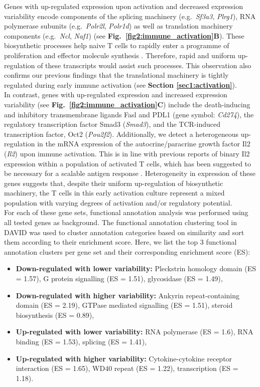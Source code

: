 Genes with up-regulated expression upon activation and decreased expression variability encode components of the splicing machinery (e.g.~\textit{Sf3a3}, \textit{Plrg1}), RNA polymerase subunits (e.g.~\textit{Polr2l}, \textit{Polr1d}) as well as translation machinery components (e.g.~\textit{Ncl}, \textit{Naf1}) (see \textbf{Fig.~\ref{fig2:immune_activation}B}). 
These biosynthetic processes help naive T cells to rapidly enter a programme of proliferation and effector molecule synthesis \citep{Tan2017,Araki2017}. 
Therefore, rapid and uniform up-regulation of these transcripts would assist such processes. 
This observation also confirms our previous findings that the translational machinery is tightly regulated during early immune activation (see \textbf{Section \ref{sec1:activation}}).\\

In contrast, genes with up-regulated expression and increased expression variability (see \textbf{Fig.~\ref{fig2:immune_activation}C}) include the death-inducing and inhibitory transmembrane ligands \gls{Fasl} and \gls{PDL1} (gene symbol: \textit{Cd274}), the regulatory transcription factor Smad3 (\textit{Smad3}), and the TCR-induced transcription factor, Oct2 (\textit{Pou2f2}). 
Additionally, we detect a heterogeneous up-regulation in the mRNA expression of the autocrine/paracrine growth factor Il2 (\textit{Il2}) upon immune activation. 
This is in line with previous reports of binary Il2 expression within a population of activated T cells, which has been suggested to be necessary for a scalable antigen response \citep{Fuhrmann2016}. 
Heterogeneity in expression of these genes suggests that, despite their uniform up-regulation of biosynthetic machinery, the T cells in this early activation culture represent a mixed population with varying degrees of activation and/or regulatory potential. \\

For each of these gene sets, functional annotation analysis was performed using all tested genes as background. 
The functional annotation clustering tool in DAVID \citep{Dennis2003} was used to cluster annotation categories based on similarity and sort them according to their enrichment score. 
Here, we list the top 3 functional annotation clusters per gene set and their corresponding enrichment score (ES):
\begin{itemize}
\item \textbf{Down-regulated with lower variability:} Pleckstrin homology domain (ES = 1.57), G protein signalling (ES = 1.51), glycosidase (ES = 1.49),
\item \textbf{Down-regulated with higher variability:} Ankyrin repeat-containing domain (ES = 2.19), GTPase mediated signalling (ES = 1.51), steroid biosynthesis (ES = 0.89), 
\item \textbf{Up-regulated with lower variability:} RNA polymerase (ES = 1.6), RNA binding (ES = 1.53), splicing (ES = 1.41),
\item \textbf{Up-regulated with higher variability:} Cytokine-cytokine receptor interaction (ES = 1.65), WD40 repeat (ES = 1.22), transcription (ES = 1.18).
\end{itemize}

